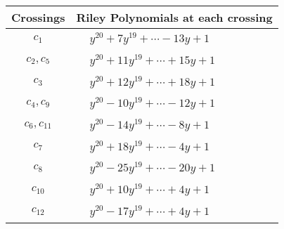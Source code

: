 \documentclass[1p]{elsarticle_modified}
\theoremstyle{definition}
\begin{document}
\begin{tabular}{m{50pt}|m{274pt}}
Crossings & \hspace{64pt}Riley Polynomials at each crossing \\
\hline $$\begin{aligned}c_{1}\end{aligned}$$&$\begin{aligned}
&y^{20}+7 y^{19}+\cdots-13 y+1
\end{aligned}$\\
\hline $$\begin{aligned}c_{2},c_{5}\end{aligned}$$&$\begin{aligned}
&y^{20}+11 y^{19}+\cdots+15 y+1
\end{aligned}$\\
\hline $$\begin{aligned}c_{3}\end{aligned}$$&$\begin{aligned}
&y^{20}+12 y^{19}+\cdots+18 y+1
\end{aligned}$\\
\hline $$\begin{aligned}c_{4},c_{9}\end{aligned}$$&$\begin{aligned}
&y^{20}-10 y^{19}+\cdots-12 y+1
\end{aligned}$\\
\hline $$\begin{aligned}c_{6},c_{11}\end{aligned}$$&$\begin{aligned}
&y^{20}-14 y^{19}+\cdots-8 y+1
\end{aligned}$\\
\hline $$\begin{aligned}c_{7}\end{aligned}$$&$\begin{aligned}
&y^{20}+18 y^{19}+\cdots-4 y+1
\end{aligned}$\\
\hline $$\begin{aligned}c_{8}\end{aligned}$$&$\begin{aligned}
&y^{20}-25 y^{19}+\cdots-20 y+1
\end{aligned}$\\
\hline $$\begin{aligned}c_{10}\end{aligned}$$&$\begin{aligned}
&y^{20}+10 y^{19}+\cdots+4 y+1
\end{aligned}$\\
\hline $$\begin{aligned}c_{12}\end{aligned}$$&$\begin{aligned}
&y^{20}-17 y^{19}+\cdots+4 y+1
\end{aligned}$\\
\hline
\end{tabular}\\~\\
\end{document}
